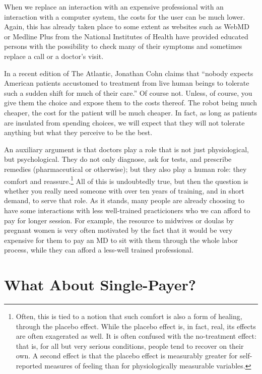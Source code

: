 When we replace an interaction with an expensive professional with an
interaction with a computer system, the costs for the user can be much lower.
Again, this has already taken place to some extent as websites such as WebMD or
Medline Plus from the National Institutes of Health have provided educated
persons with the possibility to check many of their symptoms and sometimes
replace a call or a doctor's visit.

In a recent edition of The Atlantic, Jonathan Cohn claims that ``nobody expects
American patients accustomed to treatment from live human beings to tolerate
such a sudden shift for much of their care.'' Of course not. Unless,
of course, you give them the choice and expose them to the costs thereof. The
robot being much cheaper, the cost for the patient will be much cheaper. In
fact, as long as patients are insulated from spending choices, we will expect
that they will not tolerate anything but what they perceive to be the best.

An auxiliary argument is that doctors play a role that is not just
physiological, but psychological. They do not only diagnose, ask for tests, and
prescribe remedies (pharmaceutical or otherwise); but they also play a human
role: they comfort and reassure.\footnote{Often, this is tied to a notion that
such comfort is also a form of healing, through the placebo effect. While the
placebo effect is, in fact, real, its effects are often exagerated as well. It
is often confused with the no-treatment effect: that is, for all but very
serious conditions, people tend to recover on their own. A second effect is
that the placebo effect is measurably greater for self-reported measures of
feeling than for physiologically measurable variables.} All of this is
undoubtedly true, but then the question is whether you really need someone with
over ten years of training, and in short demand, to serve that role. As it
stands, many people are already choosing to have some interactions with less
well-trained practicioners who we can afford to pay for longer session.  For
example, the resource to midwives or doulas by pregnant women is very often
motivated by the fact that it would be very expensive for them to pay an MD to
sit with them through the whole labor process, while they can afford a
less-well trained professional.

\section{What About Single-Payer?}

